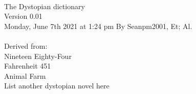 \documentclass{article} %
\title{\TheDystopianDictionary} %
\begin{document}
  \maketitle
  \TheDystopianDictionary
  \makeIndex
  \Title{} \\
  The Dystopian dictionary \\
  Version 0.01 \\
  Monday, June 7th 2021 at 1:24 pm
  By Seanpm2001, Et; Al. \\
  \\
  Derived from: \\
  Nineteen Eighty-Four \\
  Fahrenheit 451 \\
  Animal Farm \\
  List another dystopian novel here \\
  \\
  \\
  \\
  \\
\end{document}
